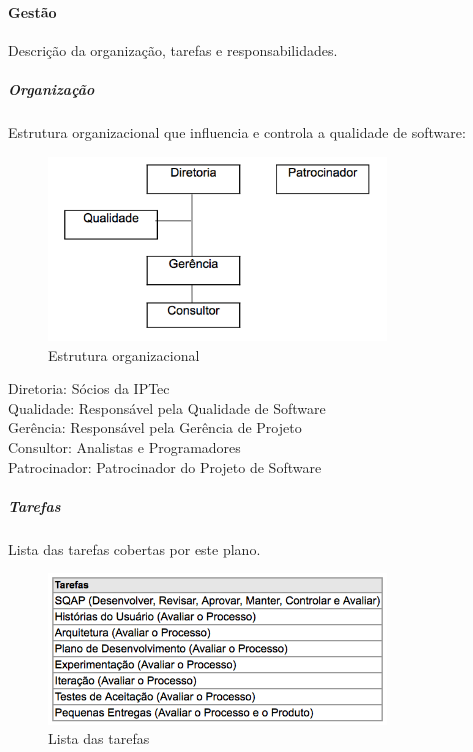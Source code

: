 \paragraph{Gestão}

Descrição da organização, tarefas e responsabilidades.

\subparagraph{Organização}

Estrutura organizacional que influencia e controla a qualidade de software:

\begin{figure}[H]
  \centering
  \includegraphics[width=0.8\textwidth]{softwareengineer/images/hierarchy} 
  \caption{Estrutura organizacional}
  \label{fig:hierarchy} 
\end{figure}

Diretoria: Sócios da IPTec \\

Qualidade: Responsável pela Qualidade de Software \\

Gerência: Responsável pela Gerência de Projeto \\

Consultor: Analistas e Programadores \\

Patrocinador: Patrocinador do Projeto de Software \\

\subparagraph{Tarefas}

Lista das tarefas cobertas por este plano.

\begin{figure}[H]
  \centering
  \includegraphics[width=0.8\textwidth]{softwareengineer/images/task-list} 
  \caption{Lista das tarefas}
  \label{fig:task-list} 
\end{figure}


